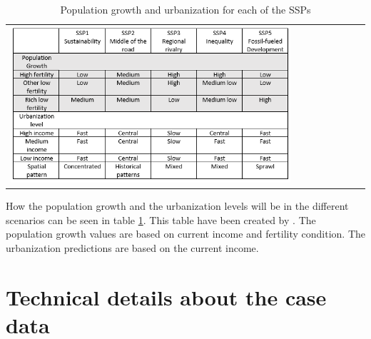 \begin{table}[htbp]
	\centering
	\begin{tabular}{l}
		\includegraphics[width=0.8\textwidth]{Pictures/SSPTable}
	\end{tabular}
	\caption{Population growth and urbanization for each of the SSPs}
	\label{SSPTable}
\end{table}

How the population growth and the urbanization levels will be in the different scenarios can be seen in table \ref{SSPTable}. This table have been created by \citet{MaybeSEDAC}. The population growth values are based on current income and fertility condition. The urbanization predictions are based on the current income.


\section{Technical details about the case data}

